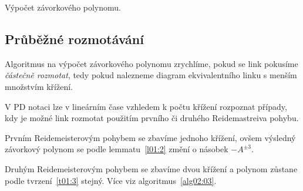 \begin{algorithm}[h]

\caption{Výpočet závorkového polynomu.}
\label{alg02:02}

\DontPrintSemicolon

%




\end{algorithm}

\subsection{Průběžné rozmotávání}
Algoritmus na výpočet závorkového polynomu zrychlíme, pokud se link pokusíme \emph{částečně rozmotat}, tedy pokud nalezneme diagram ekvivalentního linku s menším množstvím křížení. 

V PD notaci lze v lineárním čase vzhledem k počtu křížení rozpoznat případy, kdy je možné link rozmotat použitím prvního či druhého Reidemastreiva pohybu.

Prvním Reidemeisterovým pohybem se zbavíme jednoho křížení, ovšem výsledný závorkový polynom se podle lemmatu~\ref{l01:2} změní o násobek $-A^{\pm3}$.

Druhým Reidemeisterovým pohybem se zbavíme dvou křížení a polynom zůstane podle tvrzení~\ref{t01:3} stejný. Více viz algoritmus~\ref{alg02:03}.

